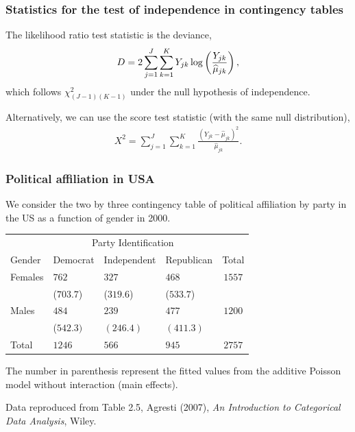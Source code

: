 \documentclass{beamer}
\begin{document}
\begin{frame}
\frametitle{Statistics for the test of independence in contingency tables}
\bi
 \item The likelihood ratio test statistic is the deviance, 
  \begin{align*}
   D= 2 \sum_{j=1}^J \sum_{k=1}^K Y_{jk}\log \left(\frac{Y_{jk}}{\widehat{\mu}_{jk}}\right),
  \end{align*}
which follows $\chi^2_{(J-1)(K-1)}$ under the null hypothesis of independence.
\item Alternatively, we can use the score test statistic (with the same null distribution), 
\begin{align*}
 X^2 = \sum_{j=1}^J \sum_{k=1}^K \frac{(Y_{jk}-\hat{\mu}_{jk})^2}{\hat{\mu}_{jk}}.
\end{align*}
  \ei 
\end{frame}
\begin{frame}[fragile]
 \frametitle{Political affiliation in USA}
 We consider the two by three contingency table of political affiliation by party in the US as a function of gender in 2000.
 \begin{center}
 \begin{tabular}{llllc}
 \toprule 
  & \multicolumn{3}{c}{Party Identification} & \\
  \cmidrule(r){2-4}
  Gender & Democrat & Independent & Republican & Total\\
  Females & $762$ & $327$ & $468$ & $1557$ \\
   & ($703.7$) & ($319.6$) & ($533.7$) & \\
   Males & $484$ & $239$ & $477$ & $1200$ \\
    & ($542.3)$ & $(246.4)$ & $(411.3)$ & \\
    Total & $1246$ & $566$ & $945$ &$2757$\\
    \bottomrule 
    \end{tabular}
    \end{center}
    The number in parenthesis represent the fitted values from the additive Poisson model without interaction (main effects).

     
  {   \footnotesize
 Data reproduced from Table 2.5, Agresti (2007), \textsl{An Introduction to
Categorical Data Analysis}, Wiley.


}
\end{frame}
\end{document}
